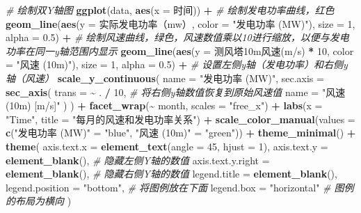 \documentclass[
]{ctexart}
\newenvironment{Shaded}{\begin{snugshade}}{\end{snugshade}}
\newcommand{\AttributeTok}[1]{\textcolor[rgb]{0.13,0.29,0.53}{#1}}
\newcommand{\CommentTok}[1]{\textcolor[rgb]{0.56,0.35,0.01}{\textit{#1}}}
\newcommand{\DecValTok}[1]{\textcolor[rgb]{0.00,0.00,0.81}{#1}}
\newcommand{\FloatTok}[1]{\textcolor[rgb]{0.00,0.00,0.81}{#1}}
\newcommand{\FunctionTok}[1]{\textcolor[rgb]{0.13,0.29,0.53}{\textbf{#1}}}
\newcommand{\NormalTok}[1]{#1}
\newcommand{\OtherTok}[1]{\textcolor[rgb]{0.56,0.35,0.01}{#1}}
\newcommand{\SpecialCharTok}[1]{\textcolor[rgb]{0.81,0.36,0.00}{\textbf{#1}}}
\newcommand{\StringTok}[1]{\textcolor[rgb]{0.31,0.60,0.02}{#1}}
\begin{document}
\begin{Shaded}
\begin{Highlighting}[]
\CommentTok{\# 绘制双Y轴图}
\FunctionTok{ggplot}\NormalTok{(data, }\FunctionTok{aes}\NormalTok{(}\AttributeTok{x =}\NormalTok{ 时间)) }\SpecialCharTok{+}
  \CommentTok{\# 绘制发电功率曲线，红色}
  \FunctionTok{geom\_line}\NormalTok{(}\FunctionTok{aes}\NormalTok{(}\AttributeTok{y =} \StringTok{\textasciigrave{}}\AttributeTok{实际发电功率（mw）}\StringTok{\textasciigrave{}}\NormalTok{, }\AttributeTok{color =} \StringTok{"发电功率 (MW)"}\NormalTok{), }\AttributeTok{size =} \DecValTok{1}\NormalTok{, }\AttributeTok{alpha =} \FloatTok{0.5}\NormalTok{) }\SpecialCharTok{+}
  \CommentTok{\# 绘制风速曲线，绿色，风速数值乘以10进行缩放，以便与发电功率在同一y轴范围内显示}
  \FunctionTok{geom\_line}\NormalTok{(}\FunctionTok{aes}\NormalTok{(}\AttributeTok{y =} \StringTok{\textasciigrave{}}\AttributeTok{测风塔10m风速(m/s)}\StringTok{\textasciigrave{}} \SpecialCharTok{*} \DecValTok{10}\NormalTok{, }\AttributeTok{color =} \StringTok{"风速 (10m)"}\NormalTok{), }\AttributeTok{size =} \DecValTok{1}\NormalTok{, }\AttributeTok{alpha =} \FloatTok{0.5}\NormalTok{) }\SpecialCharTok{+}
  \CommentTok{\# 设置左侧y轴（发电功率）和右侧y轴（风速）}
  \FunctionTok{scale\_y\_continuous}\NormalTok{(}
    \AttributeTok{name =} \StringTok{"发电功率 (MW)"}\NormalTok{,}
    \AttributeTok{sec.axis =} \FunctionTok{sec\_axis}\NormalTok{(}
      \AttributeTok{trans =} \SpecialCharTok{\textasciitilde{}}\NormalTok{ . }\SpecialCharTok{/} \DecValTok{10}\NormalTok{,  }\CommentTok{\# 将右侧y轴数值恢复到原始风速值}
      \AttributeTok{name =} \StringTok{"风速 (10m) [m/s]"}
\NormalTok{    )}
\NormalTok{  ) }\SpecialCharTok{+}
  \FunctionTok{facet\_wrap}\NormalTok{(}\SpecialCharTok{\textasciitilde{}}\NormalTok{ month, }\AttributeTok{scales =} \StringTok{"free\_x"}\NormalTok{) }\SpecialCharTok{+}
  \FunctionTok{labs}\NormalTok{(}\AttributeTok{x =} \StringTok{"Time"}\NormalTok{, }\AttributeTok{title =} \StringTok{"每月的风速和发电功率关系"}\NormalTok{) }\SpecialCharTok{+}
  \FunctionTok{scale\_color\_manual}\NormalTok{(}\AttributeTok{values =} \FunctionTok{c}\NormalTok{(}\StringTok{"发电功率 (MW)"} \OtherTok{=} \StringTok{"blue"}\NormalTok{, }\StringTok{"风速 (10m)"} \OtherTok{=} \StringTok{"green"}\NormalTok{)) }\SpecialCharTok{+}
  \FunctionTok{theme\_minimal}\NormalTok{() }\SpecialCharTok{+}
  \FunctionTok{theme}\NormalTok{(}
    \AttributeTok{axis.text.x =} \FunctionTok{element\_text}\NormalTok{(}\AttributeTok{angle =} \DecValTok{45}\NormalTok{, }\AttributeTok{hjust =} \DecValTok{1}\NormalTok{),}
    \AttributeTok{axis.text.y =} \FunctionTok{element\_blank}\NormalTok{(),  }\CommentTok{\# 隐藏左侧Y轴的数值}
    \AttributeTok{axis.text.y.right =} \FunctionTok{element\_blank}\NormalTok{(),  }\CommentTok{\# 隐藏右侧Y轴的数值}
    \AttributeTok{legend.title =} \FunctionTok{element\_blank}\NormalTok{(),}
    \AttributeTok{legend.position =} \StringTok{"bottom"}\NormalTok{,  }\CommentTok{\# 将图例放在下面}
    \AttributeTok{legend.box =} \StringTok{"horizontal"}  \CommentTok{\# 图例的布局为横向}
\NormalTok{  )}
\end{Highlighting}
\end{Shaded}
\end{document}
